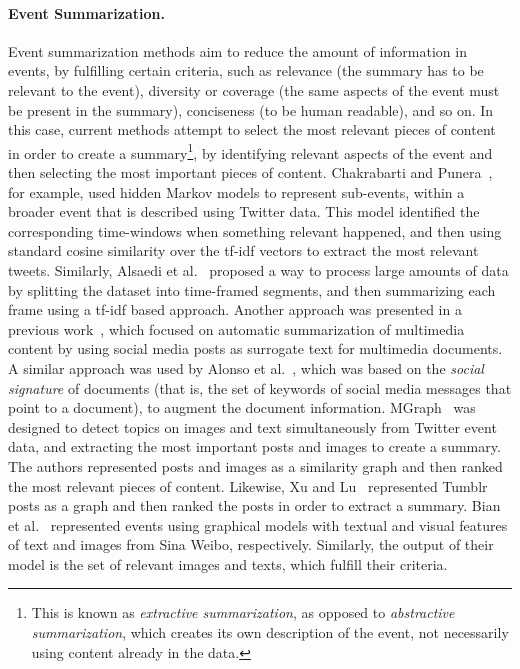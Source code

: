 \paragraph{Event Summarization.} 
%
Event summarization methods aim to reduce the amount of information in events,
by fulfilling certain criteria, such as relevance (the summary has to be relevant
to the event), diversity or coverage (the same aspects of the event must be
present in the summary), conciseness (to be human readable), and so on.
%
In this case, current methods attempt to select the most relevant pieces of
content in order to create a summary\footnote{This is known as {\em extractive
summarization}, as opposed to {\em abstractive summarization}, which creates its
own description of the event, not necessarily using content already in the
data.}, by identifying relevant aspects of the event and then selecting the most
important pieces of content.
%
Chakrabarti and Punera~\cite{chakrabarti2011event}, for example, used hidden
Markov models to represent sub-events, within a broader event that is described
using Twitter data. 
%
This model identified the corresponding time-windows when something relevant
happened, and then using standard cosine similarity over the tf-idf vectors to
extract the most relevant tweets.
%
Similarly, Alsaedi et al.~\cite{alsaedi2016temporal} proposed a way to process
large amounts of data by splitting the dataset into time-framed segments, and
then summarizing each frame using a tf-idf based approach.
%
Another approach was presented in a previous
work~\cite{quezada2013understanding}, which focused on automatic summarization
of multimedia content by using social media posts as surrogate text for
multimedia documents.
%
A similar approach was used by Alonso et
al.~\cite{Alonso:2015:WCW:2740908.2745397}, which was based on the \emph{social
signature} of documents (that is, the set of keywords of social media messages
that point to a document), to augment the document information.
%
MGraph~\cite{schinas2016mgraph} was designed to detect topics on images and text
simultaneously from Twitter event data, and extracting the most important posts
and images to create a summary.
%
The authors represented posts and images as a similarity graph and then ranked
the most relevant pieces of content.
%
Likewise, Xu and Lu~\cite{Xu:2015:SBP:2678025.2701385} represented Tumblr posts
as a graph and then ranked the posts in order to extract a summary.
%
Bian et al.~\cite{bian2014multimedia} represented events using graphical models
with textual and visual features of text and images from Sina Weibo,
respectively.
%
Similarly, the output of their model is the set of relevant images and texts,
which fulfill their criteria.


